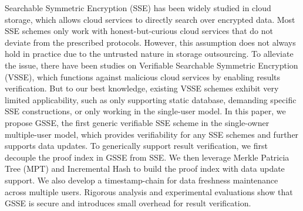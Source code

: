
\begin{eabstract}
  Searchable Symmetric Encryption (SSE) has been widely studied in cloud storage, which allows cloud services to directly search over encrypted data. Most SSE schemes only work with honest-but-curious cloud services that do not deviate from the prescribed protocols. However, this assumption does not always hold in practice due to the untrusted nature in storage outsourcing. To alleviate the issue, there have been studies on Verifiable Searchable Symmetric Encryption (VSSE), which functions against malicious cloud services by enabling results verification. But to our best knowledge, existing VSSE schemes exhibit very limited applicability, such as only supporting static database, demanding specific SSE constructions, or only working in the single-user model. In this paper, we propose GSSE, the first generic verifiable SSE scheme in the single-owner multiple-user model, which provides verifiability for any SSE schemes and further supports data updates. To generically support result verification, we first decouple the proof index in GSSE from SSE. We then leverage Merkle Patricia Tree (MPT) and Incremental Hash to build the proof index with data update support. We also develop a timestamp-chain for data freshness maintenance across multiple users. Rigorous analysis and experimental evaluations show that GSSE is secure and introduces small overhead for result verification.
\end{eabstract}

